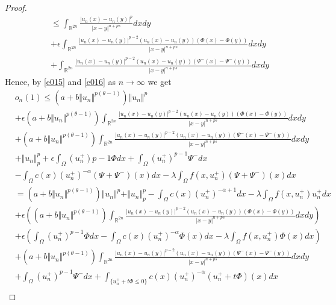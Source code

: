 \documentclass[10pt,twoside,reqno,centertags,draft]{amsart}
\begin{document}
\begin{proof}
\begin{equation}
\begin{aligned}
&\leq \int_{\mathbb{R}^{2n}}\frac{\vert u_n(x) -u_n(y)\vert^{p}}{\vert x -y\vert^{n +ps}}dxdy \\
&+\epsilon\int_{\mathbb{R}^{2n}}\frac{\vert u_n(x) -u_n(y)\vert^{p -2}(u_n(x) -u_n(y))(\Phi(x) -\Phi(y))}{\vert x -y\vert^{n +ps}}dxdy\\
&+\int_{\mathbb{R}^{2n}}\frac{\vert u_n(x) -u_n(y)\vert^{p -2}(u_n(x) -u_n(y))(\Psi^{-}(x) -\Psi^{-}(y))}{\vert x -y\vert^{n +ps}}dxdy
\end{aligned}
\end{equation}
Hence, by \ref{e015} and \ref{e016} as $ n \to \infty$ we get
{\footnotesize
\begin{equation}
\begin{aligned}
& o_n(1) \leq \left( a +b\Vert u_n\Vert^{p(\theta -1)}\right)\Vert u_n\Vert^{p}\\
& +\epsilon\left( a +b\Vert u_n\Vert^{p(\theta -1)}\right)\int_{\mathbb{R}^{2n}}\frac{\vert u_n(x) -u_n(y)\vert^{p -2}(u_n(x) -u_n(y))(\Phi(x) -\Phi(y))}{\vert x -y\vert^{n +ps}}dxdy\\
& +\left( a +b\Vert u_n\Vert^{p(\theta -1)}\right)\int_{\mathbb{R}^{2n}}\frac{\vert u_n(x) -u_n(y)\vert^{p -2}(u_n(x) -u_n(y))(\Psi^{-}(x) -\Psi^{-}(y))}{\vert x -y\vert^{n +ps}}dxdy\\
& +\Vert u_n\Vert^{p}_{p} +\epsilon\int_{\Omega}(u_n^+){p-1}\Phi dx +\int_{\Omega}(u_n^+)^{p-1}\Psi^{-}dx\\
& -\int_{\Omega}c(x)(u_n^+)^{-\alpha}(\Psi +\Psi^{-})(x) dx -\lambda \int_{\Omega}f(x, u_n^+)(\Psi +\Psi^{-})(x)dx\\
& =\left( a +b\Vert u_n\Vert^{p(\theta -1)}\right)\Vert u_n\Vert^{p} +\Vert u_n\Vert^{p}_{p} -\int_{\Omega}c(x)(u_n^+)^{-\alpha +1}dx -\lambda \int_{\Omega}f(x, u_n^+)u_n^+ dx\\
& +\epsilon \left( \left( a +b\Vert u_n\Vert^{p(\theta -1)}\right)\int_{\mathbb{R}^{2n}}\frac{\vert u_n(x) -u_n(y)\vert^{p -2}(u_n(x) -u_n(y))(\Phi(x) -\Phi(y))}{\vert x -y\vert^{n +ps}}dxdy  \right)\\
&+ \epsilon\left(\int_{\Omega}(u_n^+)^{p-1}\Phi dx -\int_{\Omega}c(x)( u_n^+)^{-\alpha}\Phi(x) dx -\lambda \int_{\Omega}f(x, u_n^+)\Phi(x)dx \right)\\
& +\left( a +b\Vert u_n\Vert^{p(\theta -1)}\right)\int_{\mathbb{R}^{2n}}\frac{\vert u_n(x) -u_n(y)\vert^{p -2}(u_n(x) -u_n(y))(\Psi^{-}(x) -\Psi^{-}(y))}{\vert x -y\vert^{n +ps}}dxdy\\
& +\int_{\Omega}(u_n^+)^{p-1}\Psi^{-}dx +\int_{\{u_n^+ +t\Phi \leq 0\}}c(x)(u_n^+)^{-\alpha}(u_n^+ +t\Phi)(x)dx\\

\end{aligned}
\end{equation}}
\end{proof}
\end{document}

